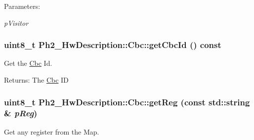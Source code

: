 \begin{Desc}
\item[Parameters:]
\begin{description}
\item[{\em p\-Visitor}]\end{description}
\end{Desc}
\hypertarget{class_ph2___hw_description_1_1_cbc_fc5c714017832171dd0ca9a76dd9be94}{
\subsubsection[getCbcId]{\setlength{\rightskip}{0pt plus 5cm}uint8\_\-t Ph2\_\-Hw\-Description::Cbc::get\-Cbc\-Id () const}}
\label{class_ph2___hw_description_1_1_cbc_fc5c714017832171dd0ca9a76dd9be94}


Get the \hyperlink{class_ph2___hw_description_1_1_cbc}{Cbc} Id. 

\begin{Desc}
\item[Returns:]The \hyperlink{class_ph2___hw_description_1_1_cbc}{Cbc} ID \end{Desc}
\hypertarget{class_ph2___hw_description_1_1_cbc_43d08080490a85b26bc172456a776048}{
\subsubsection[getReg]{\setlength{\rightskip}{0pt plus 5cm}uint8\_\-t Ph2\_\-Hw\-Description::Cbc::get\-Reg (const std::string \& {\em p\-Reg})}}
\label{class_ph2___hw_description_1_1_cbc_43d08080490a85b26bc172456a776048}


Get any register from the Map. 

